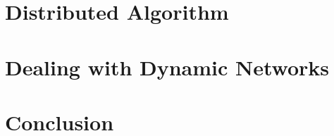 \documentclass[a4paper,11pt]{article}
\begin{document}
\section{Distributed Algorithm}





\section{Dealing with Dynamic Networks}



\section{Conclusion}





{}


\end{document}
